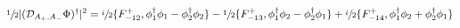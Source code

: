 \begin{equation}
 \sfrac{1}{2}|(\mathcal{D}_{A_+,A_-}\Phi)^\dagger|^2
    =\sfrac{i}{2}\{F_{-12}^+,\phi_1^\dagger \phi_1
       -\phi_2^\dagger\phi_2\}-\sfrac{1}{2}\{F_{-13}^+,
       \phi_1^\dagger\phi_2-\phi_2^\dagger\phi_1\}
  +\sfrac{i}{2}\{F_{-14}^+,\phi_1^\dagger\phi_2
      +\phi_2^\dagger\phi_1\}\notag
\end{equation}

